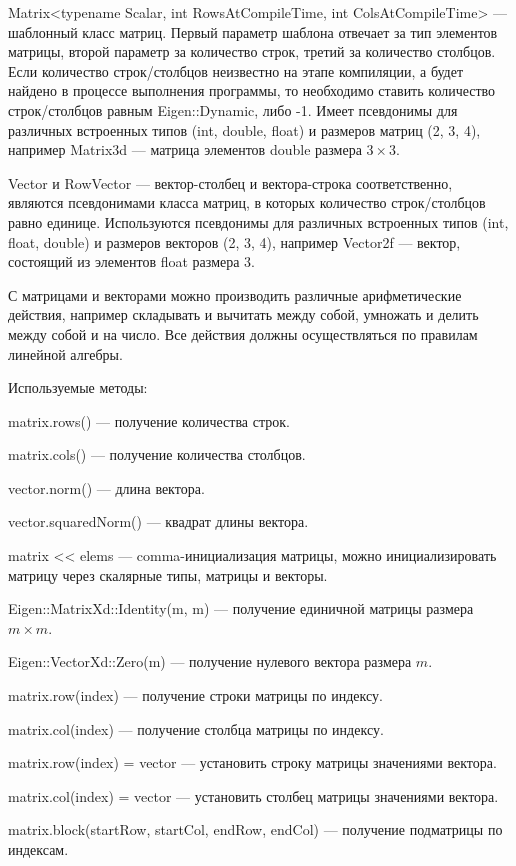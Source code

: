 Matrix<typename Scalar, int RowsAtCompileTime, int ColsAtCompileTime> --- шаблонный класс матриц. Первый параметр шаблона отвечает за тип элементов матрицы, второй параметр за количество строк, третий за количество столбцов. Если количество строк/столбцов неизвестно на этапе компиляции, а будет найдено в процессе выполнения программы, то необходимо ставить количество строк/столбцов равным Eigen::Dynamic, либо -1. Имеет псевдонимы для различных встроенных типов (int, double, float) и размеров матриц (2, 3, 4), например Matrix3d --- матрица элементов double размера $ 3 \times 3 $. 

Vector и RowVector --- вектор-столбец и вектора-строка соответственно, являются псевдонимами класса матриц, в которых количество строк/столбцов равно единице. Используются псевдонимы для различных встроенных типов (int, float, double) и размеров векторов (2, 3, 4), например Vector2f --- вектор, состоящий из элементов float размера $ 3 $.

С матрицами и векторами можно производить различные арифметические действия, например складывать и вычитать между собой, умножать и делить между собой и на число. Все действия должны осуществляться по правилам линейной алгебры. 

Используемые методы:

matrix.rows() --- получение количества строк.

matrix.cols() --- получение количества столбцов.

vector.norm() --- длина вектора.

vector.squaredNorm() --- квадрат длины вектора.

matrix << elems --- comma-инициализация матрицы, можно инициализировать матрицу через скалярные типы, матрицы и векторы.

Eigen::MatrixXd::Identity(m, m) --- получение единичной матрицы размера $ m \times m $.

Eigen::VectorXd::Zero(m) --- получение нулевого вектора размера $ m $.

matrix.row(index) --- получение строки матрицы по индексу.

matrix.col(index) --- получение столбца матрицы по индексу.

matrix.row(index) = vector --- установить строку матрицы значениями вектора.

matrix.col(index) = vector --- установить столбец матрицы значениями вектора.

matrix.block(startRow, startCol, endRow, endCol) --- получение подматрицы по индексам.

